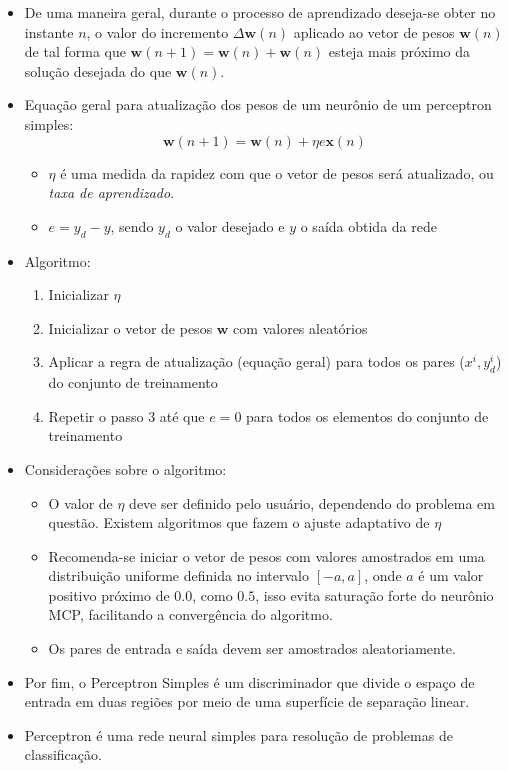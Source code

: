 \documentclass{article}
\begin{document}
\begin{itemize}
\begin{itemize}
		\item De uma maneira geral, durante o processo de aprendizado deseja-se obter no instante $n$, o valor do incremento $\Delta \mathbf{w}(n)$ aplicado ao vetor de pesos $\mathbf{w}(n)$ de tal forma que $\mathbf{w}(n+1) = \mathbf{w}(n) + \mathbf{w}(n)$ esteja mais próximo da solução desejada do que $\mathbf{w}(n)$.
		\item Equação geral para atualização dos pesos de um neurônio de um perceptron simples:
		$$ \mathbf{w}(n+1) = \mathbf{w}(n) + \eta e \mathbf{x}(n)$$
		\begin{itemize}
			\item $\eta$ é uma medida da rapidez com que o vetor de pesos será atualizado, ou \textit{taxa de aprendizado}.
			\item $e = y_d - y$, sendo $y_d$ o valor desejado e $y$ o saída obtida da rede
		\end{itemize}
		\item Algoritmo:
		\begin{enumerate}
			\item Inicializar $\eta$
			\item Inicializar o vetor de pesos $\mathbf{w}$ com valores aleatórios
			\item Aplicar a regra de atualização (equação geral) para todos os pares ($x^i,y_d^i$) do conjunto de treinamento
			\item Repetir o passo 3 até que $e = 0$ para todos os elementos do conjunto de treinamento
		\end{enumerate}
		\item Considerações sobre o algoritmo:
		\begin{itemize}
			\item O valor de $\eta$ deve ser definido pelo usuário, dependendo do problema em questão. Existem algoritmos que fazem o ajuste adaptativo de $\eta$
			\item Recomenda-se iniciar o vetor de pesos com valores amostrados em uma distribuição uniforme definida no intervalo $[-a,a]$, onde $a$ é um valor positivo próximo de $0.0$, como $0.5$, isso evita saturação forte do neurônio MCP, facilitando a convergência do algoritmo.
			\item Os pares de entrada e saída devem ser amostrados aleatoriamente.
		\end{itemize}
		\item Por fim, o Perceptron Simples é um discriminador que divide o espaço de entrada em duas regiões por meio de uma superfície de separação linear.
		\item Perceptron é uma rede neural simples para resolução de problemas de classificação.
	\end{itemize}

\end{itemize}
\end{document}
